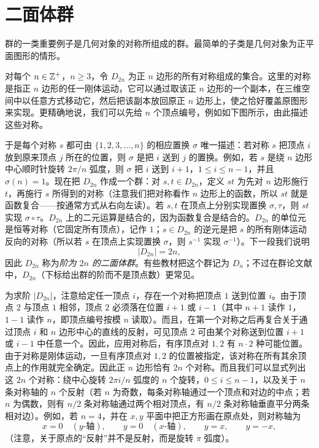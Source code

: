 \section{二面体群}

群的一类重要例子是几何对象的对称所组成的群。最简单的子类是几何对象为正平面图形的情形。

对每个 $n\in\mathbb{Z}^+$，$n\geq3$，令 $D_{2n}$ 为正 $n$ 边形的所有对称组成的集合。这里的对称是指正 $n$ 边形的任一刚体运动，它可以通过取该正 $n$ 边形的一个副本，在三维空间中以任意方式移动它，然后把该副本放回原正 $n$ 边形上，使之恰好覆盖原图形来实现。更精确地说，我们可以先给 $n$ 个顶点编号，例如如下图所示，由此描述这些对称。

\begin{center}
\end{center}

于是每个对称 $s$ 都可由 $\{1,2,3,\ldots,n\}$ 的相应置换 $\sigma$ 唯一描述：若对称 $s$ 把顶点 $i$ 放到原来顶点 $j$ 所在的位置，则 $\sigma$ 是把 $i$ 送到 $j$ 的置换。例如，若 $s$ 是绕 $n$ 边形中心顺时针旋转 $2\pi/n$ 弧度，则 $\sigma$ 把 $i$ 送到 $i+1$，$1\leq i\leq n-1$，并且 $\sigma(n)=1$。现在把 $D_{2n}$ 作成一个群：对 $s,t\in D_{2n}$，定义 $st$ 为先对 $n$ 边形施行 $t$，再施行 $s$ 所得到的对称（注意我们把对称看作 $n$ 边形上的函数，所以 $st$ 就是函数复合——按通常方式从右向左读）。若 $s,t$ 在顶点上分别实现置换 $\sigma,\tau$，则 $st$ 实现 $\sigma\circ\tau$。$D_{2n}$ 上的二元运算是结合的，因为函数复合是结合的。$D_{2n}$ 的单位元是恒等对称（它固定所有顶点），记作 $1$；$s\in D_{2n}$ 的逆元是把 $s$ 的所有刚体运动反向的对称（所以若 $s$ 在顶点上实现置换 $\sigma$，则 $s^{-1}$ 实现 $\sigma^{-1}$）。下一段我们说明
\[
  |D_{2n}|=2n,
\]
因此 $D_{2n}$ 称为\emph{阶为 $2n$ 的二面体群}。有些教材把这个群记为 $D_n$；不过在群论文献中，$D_{2n}$（下标给出群的阶而不是顶点数）更常见。

为求阶 $|D_{2n}|$，注意给定任一顶点 $i$，存在一个对称把顶点 $1$ 送到位置 $i$。由于顶点 $2$ 与顶点 $1$ 相邻，顶点 $2$ 必须落在位置 $i+1$ 或 $i-1$（其中 $n+1$ 读作 $1$，$1-1$ 读作 $n$，即顶点编号按模 $n$ 读取）。而且，在第一个对称之后再复合关于通过顶点 $i$ 和 $n$ 边形中心的直线的反射，可见顶点 $2$ 可由某个对称送到位置 $i+1$ 或 $i-1$ 中任意一个。因此，应用对称后，有序顶点对 $1,2$ 有 $n\cdot2$ 种可能位置。由于对称是刚体运动，一旦有序顶点对 $1,2$ 的位置被指定，该对称在所有其余顶点上的作用就完全确定。因此正 $n$ 边形恰有 $2n$ 个对称。而且我们可以显式列出这 $2n$ 个对称：绕中心旋转 $2\pi i/n$ 弧度的 $n$ 个旋转，$0\leq i\leq n-1$，以及关于 $n$ 条对称轴的 $n$ 个反射（若 $n$ 为奇数，每条对称轴通过一个顶点和对边的中点；若 $n$ 为偶数，则有 $n/2$ 条对称轴通过两个相对顶点，有 $n/2$ 条对称轴垂直平分两条相对边）。例如，若 $n=4$，并在 $x,y$ 平面中把正方形画在原点处，则对称轴为
\[
  x=0\quad(y\text{-轴}),\qquad y=0\quad(x\text{-轴}),\qquad y=x,
  \qquad y=-x,
\]
（注意，关于原点的“反射”并不是反射，而是旋转 $\pi$ 弧度）。

